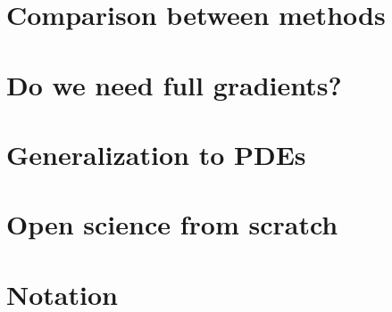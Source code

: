 \documentclass[12pt]{article}
\begin{document}
\section{Comparison between methods}


\section{Do we need full gradients?}

\section{Generalization to PDEs}

\section{Open science from scratch}

\newpage
\section{Notation}



\printbibliography
\end{document}
